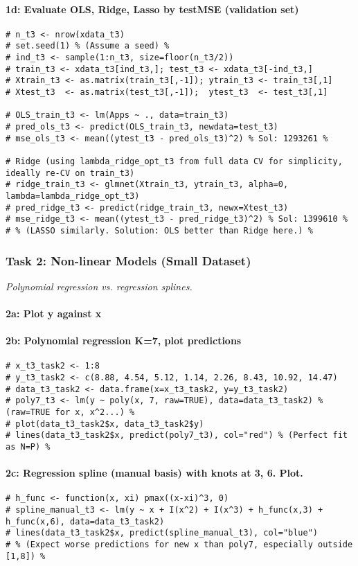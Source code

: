 \documentclass[12pt,a4paper]{article}
\begin{document}
            \paragraph{1d: Evaluate OLS, Ridge, Lasso by testMSE (validation set)}
\begin{lstlisting}
# n_t3 <- nrow(xdata_t3)
# set.seed(1) % (Assume a seed) %
# ind_t3 <- sample(1:n_t3, size=floor(n_t3/2))
# train_t3 <- xdata_t3[ind_t3,]; test_t3 <- xdata_t3[-ind_t3,]
# Xtrain_t3 <- as.matrix(train_t3[,-1]); ytrain_t3 <- train_t3[,1]
# Xtest_t3  <- as.matrix(test_t3[,-1]);  ytest_t3  <- test_t3[,1]

# OLS_train_t3 <- lm(Apps ~ ., data=train_t3)
# pred_ols_t3 <- predict(OLS_train_t3, newdata=test_t3)
# mse_ols_t3 <- mean((ytest_t3 - pred_ols_t3)^2) % Sol: 1293261 %

# Ridge (using lambda_ridge_opt_t3 from full data CV for simplicity, ideally re-CV on train_t3)
# ridge_train_t3 <- glmnet(Xtrain_t3, ytrain_t3, alpha=0, lambda=lambda_ridge_opt_t3)
# pred_ridge_t3 <- predict(ridge_train_t3, newx=Xtest_t3)
# mse_ridge_t3 <- mean((ytest_t3 - pred_ridge_t3)^2) % Sol: 1399610 %
# % (LASSO similarly. Solution: OLS better than Ridge here.) %
\end{lstlisting}

        \subsubsection{Task 2: Non-linear Models (Small Dataset)}
            \textit{Polynomial regression vs. regression splines.}
            \paragraph{2a: Plot y against x}
            \paragraph{2b: Polynomial regression K=7, plot predictions}
\begin{lstlisting}
# x_t3_task2 <- 1:8
# y_t3_task2 <- c(8.88, 4.54, 5.12, 1.14, 2.26, 8.43, 10.92, 14.47)
# data_t3_task2 <- data.frame(x=x_t3_task2, y=y_t3_task2)
# poly7_t3 <- lm(y ~ poly(x, 7, raw=TRUE), data=data_t3_task2) % (raw=TRUE for x, x^2...) %
# plot(data_t3_task2$x, data_t3_task2$y)
# lines(data_t3_task2$x, predict(poly7_t3), col="red") % (Perfect fit as N=P) %
\end{lstlisting}
            \paragraph{2c: Regression spline (manual basis) with knots at 3, 6. Plot.}
\begin{lstlisting}
# h_func <- function(x, xi) pmax((x-xi)^3, 0)
# spline_manual_t3 <- lm(y ~ x + I(x^2) + I(x^3) + h_func(x,3) + h_func(x,6), data=data_t3_task2)
# lines(data_t3_task2$x, predict(spline_manual_t3), col="blue")
# % (Expect worse predictions for new x than poly7, especially outside [1,8]) %
\end{lstlisting}
\end{document}
